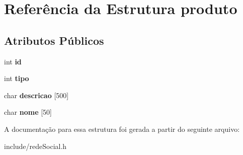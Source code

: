 \hypertarget{structproduto}{}\section{Referência da Estrutura produto}
\label{structproduto}
\subsection*{Atributos Públicos}
\begin{DoxyCompactItemize}
\item 
\mbox{\label{structproduto_afda9eec7aba2d91219870174a360dd99}} 
int {\bfseries id}
\item 
\mbox{\label{structproduto_a9162fccef5136b76f7e0a43220301b82}} 
int {\bfseries tipo}
\item 
\mbox{\label{structproduto_a1ee9c525762972da3408471fcc74e52c}} 
char {\bfseries descricao} \mbox{[}500\mbox{]}
\item 
\mbox{\label{structproduto_a73f5751f0cdfedb0ddf20ca606151f8a}} 
char {\bfseries nome} \mbox{[}50\mbox{]}
\end{DoxyCompactItemize}


A documentação para essa estrutura foi gerada a partir do seguinte arquivo\+:\begin{DoxyCompactItemize}
\item 
include/rede\+Social.\+h\end{DoxyCompactItemize}
